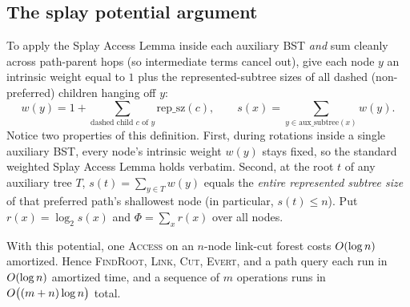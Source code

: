 \subsection{The splay potential argument}

To apply the Splay Access Lemma inside each auxiliary BST \emph{and} sum cleanly across path-parent hops (so intermediate terms cancel out), give each node $y$ an intrinsic weight equal to $1$ plus
the represented-subtree sizes of all dashed (non-preferred) children hanging off
$y$:
\[
  w(y) = 1 + \sum_{\text{dashed child } c \text{ of } y} \text{rep\_sz}(c),
  \qquad
  s(x) = \sum_{y \in \text{aux\_subtree}(x)} w(y).
\]
Notice two properties of this definition. First, during rotations inside a
single auxiliary BST, every node's intrinsic weight $w(y)$ stays fixed, so the
standard weighted Splay Access Lemma holds verbatim. Second, at the root $t$ of any
auxiliary tree $T$, $s(t)=\sum_{y\in T} w(y)$ equals the \emph{entire represented
subtree size} of that preferred path's shallowest node (in particular, $s(t)\le n$).
Put $r(x)=\log_2 s(x)$ and $\Phi=\sum_x r(x)$ over all nodes.

\begin{theorem}
\label{ch22:thm-amortized}
With this potential, one \textsc{Access} on an $n$-node link-cut forest costs
$O(\log n)$ amortized. Hence \textsc{FindRoot}, \textsc{Link}, \textsc{Cut},
\textsc{Evert}, and a path query each run in $O(\log n)$ amortized time, and a
sequence of $m$ operations runs in $O\bigl((m+n)\log n\bigr)$ total.
\end{theorem}

